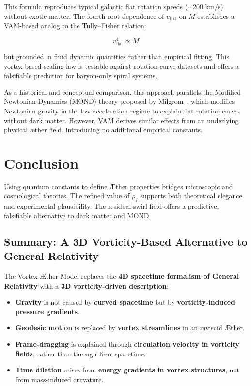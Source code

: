         This formula reproduces typical galactic flat rotation speeds ($\sim$200 km/s) without exotic matter. The fourth-root dependence of $v_{\text{flat}}$ on $M$ establishes a VAM-based analog to the Tully--Fisher relation:

        \[
            v_{\text{flat}}^4 \propto M
        \]

        but grounded in fluid dynamic quantities rather than empirical fitting. This vortex-based scaling law is testable against rotation curve datasets and offers a falsifiable prediction for baryon-only spiral systems.

        As a historical and conceptual comparison, this approach parallels the Modified Newtonian Dynamics (MOND) theory proposed by Milgrom~\cite{milgrom1983mond1, milgrom1983mond2}, which modifies Newtonian gravity in the low-acceleration regime to explain flat rotation curves without dark matter. However, VAM derives similar effects from an underlying physical æther field, introducing no additional empirical constants.

        \section*{Conclusion}

        Using quantum constants to define \AE{}ther properties bridges microscopic and cosmological theories. The refined value of $\rho_{\scriptscriptstyle\boldsymbol\!f}$ supports both theoretical elegance and experimental plausibility. The residual swirl field offers a predictive, falsifiable alternative to dark matter and MOND.




        \subsection*{Summary: A 3D Vorticity-Based Alternative to General Relativity}

    The Vortex Æther Model replaces the \textbf{4D spacetime formalism of General Relativity} with a \textbf{3D vorticity-driven description}:

    \begin{itemize}
        \item \textbf{Gravity} is not caused by \textbf{curved spacetime} but by \textbf{vorticity-induced pressure gradients}.
        \item \textbf{Geodesic motion} is replaced by \textbf{vortex streamlines} in an inviscid Æther.
        \item \textbf{Frame-dragging} is explained through \textbf{circulation velocity in vorticity fields}, rather than through Kerr spacetime.
        \item \textbf{Time dilation} arises from \textbf{energy gradients in vortex structures}, not from mass-induced curvature.
    \end{itemize}


%
%
%
